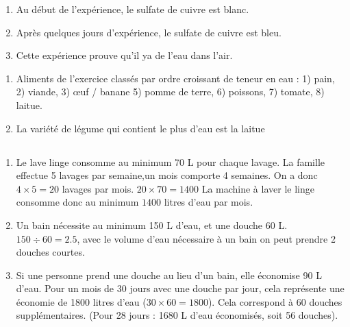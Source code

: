 \documentclass[12pt,a4paper]{article}
\begin{document}

\begin{enumerate}[label=\alph*)]
	\item Au début de l'expérience, le sulfate de cuivre est blanc.
	\item Après quelques jours d'expérience, le sulfate de cuivre est bleu.
	\item Cette expérience prouve qu'il ya de l'eau dans l'air.
\end{enumerate}


\begin{enumerate}[label=\alph*)]
	\item Aliments de l'exercice classés par ordre croissant de teneur en eau :
	1) pain, 2) viande, 3) \oe uf / banane 5) pomme de terre, 6) poissons, 7) tomate, 8) laitue.
	\item La variété de légume qui contient le plus d'eau est la laitue
\end{enumerate}

\newpage

\subsection*{}

\begin{enumerate}
	\item  Le lave linge consomme au minimum 70 L pour chaque lavage. La famille effectue 5 lavages par semaine,un mois comporte 4 semaines. On a donc $4 \times 5 = 20$ lavages par mois. $20 \times 70 =\num{ 1400}$ La machine à laver le linge consomme donc au minimum $\num{1400}$ litres d'eau par mois.
	
	\item Un bain nécessite au minimum 150 L d'eau, et une douche 60 L. $150 \div 60 = \num{2.5}$, avec le volume d'eau nécessaire à un bain on peut prendre 2 douches courtes.
	
	\item Si une personne prend une douche au lieu d'un bain, elle économise 90 L d'eau. Pour un mois de 30 jours avec une douche par jour, cela représente une économie de \num{1800} litres d'eau ($30 \times 60 = \num{1800}$). Cela correspond à 60 douches supplémentaires. (Pour 28 jours : 1680 L d'eau économisés, soit 56 douches).
\end{enumerate}
\end{document}
